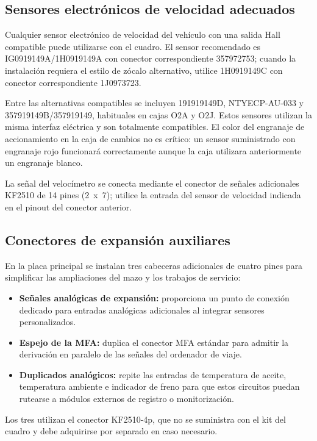 \subsection{Sensores electrónicos de velocidad adecuados}
Cualquier sensor electrónico de velocidad del vehículo con una salida Hall compatible puede utilizarse con el cuadro. El sensor recomendado es \mbox{IG0919149A/1H0919149A} con conector correspondiente \mbox{357972753}; cuando la instalación requiera el estilo de zócalo alternativo, utilice \mbox{1H0919149C} con conector correspondiente \mbox{1J0973723}.

Entre las alternativas compatibles se incluyen \mbox{191919149D}, \mbox{NTYECP-AU-033} y \mbox{357919149B/357919149}, habituales en cajas O2A y O2J. Estos sensores utilizan la misma interfaz eléctrica y son totalmente compatibles. El color del engranaje de accionamiento en la caja de cambios no es crítico: un sensor suministrado con engranaje rojo funcionará correctamente aunque la caja utilizara anteriormente un engranaje blanco.

La señal del velocímetro se conecta mediante el conector de señales adicionales \mbox{KF2510} de 14 pines (2~x~7); utilice la entrada del sensor de velocidad indicada en el pinout del conector anterior.

\subsection{Conectores de expansión auxiliares}
En la placa principal se instalan tres cabeceras adicionales de cuatro pines para simplificar las ampliaciones del mazo y los trabajos de servicio:
\begin{itemize}
    \item \textbf{Señales analógicas de expansión:} proporciona un punto de conexión dedicado para entradas analógicas adicionales al integrar sensores personalizados.
    \item \textbf{Espejo de la MFA:} duplica el conector \textsc{MFA} estándar para admitir la derivación en paralelo de las señales del ordenador de viaje.
    \item \textbf{Duplicados analógicos:} repite las entradas de temperatura de aceite, temperatura ambiente e indicador de freno para que estos circuitos puedan rutearse a módulos externos de registro o monitorización.
\end{itemize}
Los tres utilizan el conector \mbox{KF2510-4p}, que no se suministra con el kit del cuadro y debe adquirirse por separado en caso necesario.

